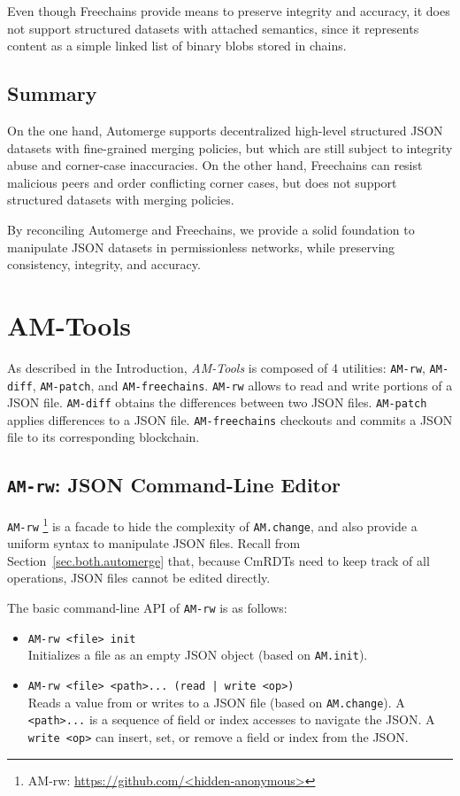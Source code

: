 \documentclass[12pt]{article}
\newcommand{\AMT}      {\emph{AM-Tools}\xspace}
\newcommand{\code}[1]  {\texttt{\footnotesize{#1}}}
\newcommand{\amrw}       {\texttt{AM-rw}\xspace}
\newcommand{\amdiff}     {\texttt{AM-diff}\xspace}
\newcommand{\ampatch}    {\texttt{AM-patch}\xspace}
\begin{document}
Even though Freechains provide means to preserve integrity and accuracy, it
does not support structured datasets with attached semantics, since it
represents content as a simple linked list of binary blobs stored in chains.

\subsection{Summary}

On the one hand, Automerge supports decentralized high-level structured JSON
datasets with fine-grained merging policies, but which are still subject to
integrity abuse and corner-case inaccuracies.
%
On the other hand, Freechains can resist malicious peers and order conflicting
corner cases, but does not support structured datasets with merging policies.

By reconciling Automerge and Freechains, we provide a solid foundation to
manipulate JSON datasets in permissionless networks, while preserving
consistency, integrity, and accuracy.

\section{AM-Tools}
\label{sec.amtools}

As described in the Introduction, \AMT is composed of 4 utilities:
    \amrw, \amdiff, \ampatch, and \code{AM-freechains}.
%
\amrw allows to read and write portions of a JSON file.
\amdiff obtains the differences between two JSON files.
\ampatch applies differences to a JSON file.
\code{AM-freechains} checkouts and commits a JSON file to its corresponding
blockchain.

\subsection{\amrw: JSON Command-Line Editor}

\amrw%
    \footnote{AM-rw: \url{https://github.com/<hidden-anonymous>}}
is a facade to hide the complexity of \code{AM.change}, and also provide a
uniform syntax to manipulate JSON files.
Recall from Section~\ref{sec.both.automerge} that, because CmRDTs need to keep
track of all operations, JSON files cannot be edited directly.

The basic command-line API of \amrw is as follows:

\begin{itemize}
\item \code{AM-rw <file> init} \\
    Initializes a file as an empty JSON object (based on \code{AM.init}).
\item \code{AM-rw <file> <path>... (read | write <op>)} \\
    Reads a value from or writes to a JSON file (based on \code{AM.change}).
    A \code{<path>...} is a sequence of field or index accesses to navigate the
    JSON.
    A \code{write <op>} can insert, set, or remove a field or index from the
    JSON.
\end{itemize}
\end{document}
